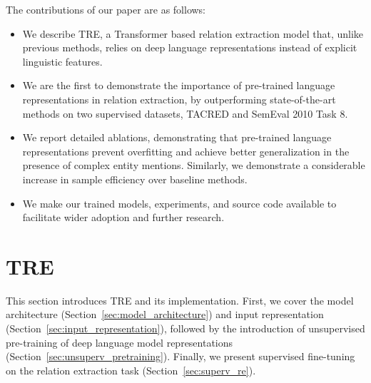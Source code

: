 \documentclass[akbc,twoside,11pt]{article}
\begin{document}
The contributions of our paper are as follows:
\begin{itemize}
    \item We describe TRE, a Transformer based relation extraction model that, unlike previous methods, relies on deep language representations instead of explicit linguistic features.
    
    \item We are the first to demonstrate the importance of pre-trained language representations in relation extraction, by outperforming state-of-the-art methods on two supervised datasets, TACRED and SemEval 2010 Task 8.
    
    \item We report detailed ablations, demonstrating that pre-trained language representations prevent overfitting and achieve better generalization in the presence of complex entity mentions. Similarly, we demonstrate a considerable increase in sample efficiency over baseline methods.
    
    \item We make our trained models, experiments, and source code available to facilitate wider adoption and further research.
\end{itemize}






\section{TRE}
This section introduces TRE and its implementation. First, we cover the model architecture (Section~\ref{sec:model_architecture}) and input representation (Section~\ref{sec:input_representation}), followed by the introduction of unsupervised pre-training of deep language model representations (Section~\ref{sec:unsuperv_pretraining}). Finally, we present supervised fine-tuning on the relation extraction task (Section~\ref{sec:superv_re}).
\end{document}
